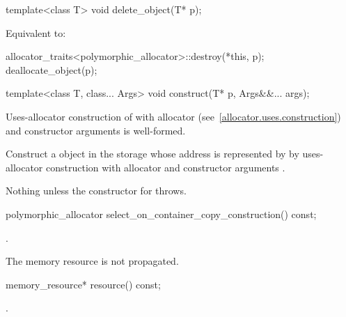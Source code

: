 %
\begin{itemdecl}
template<class T>
  void delete_object(T* p);
\end{itemdecl}

\begin{itemdescr}
\pnum
\effects
Equivalent to:
\begin{codeblock}
allocator_traits<polymorphic_allocator>::destroy(*this, p);
deallocate_object(p);
\end{codeblock}
\end{itemdescr}

%
\begin{itemdecl}
template<class T, class... Args>
  void construct(T* p, Args&&... args);
\end{itemdecl}

\begin{itemdescr}
\pnum
\mandates
Uses-allocator construction of 
with allocator  (see~\ref{allocator.uses.construction})
and constructor arguments  is well-formed.

\pnum
\effects
Construct a  object in the storage
whose address is represented by 
by uses-allocator construction with allocator 
and constructor arguments .

\pnum
\throws
Nothing unless the constructor for  throws.
\end{itemdescr}

%
\begin{itemdecl}
polymorphic_allocator select_on_container_copy_construction() const;
\end{itemdecl}

\begin{itemdescr}
\pnum
\returns
{}.

\pnum
\begin{note}
The memory resource is not propagated.
\end{note}
\end{itemdescr}

%
\begin{itemdecl}
memory_resource* resource() const;
\end{itemdecl}

\begin{itemdescr}
\pnum
\returns
{}.
\end{itemdescr}

